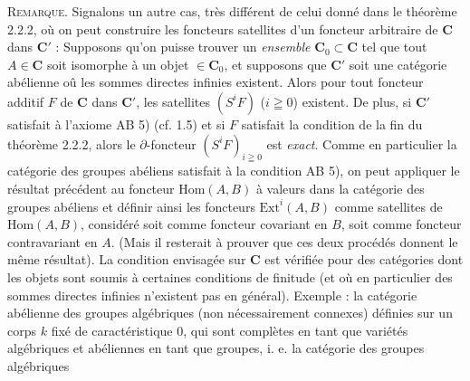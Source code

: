 \indent\textsc{Remarque.} Signalons un autre cas, très différent de celui
donné dans le théorème 2.2.2, où on peut construire les foncteurs satellites
d'un foncteur arbitraire de $\mathbf{C}$ dans $\mathbf{C}'$ : Supposons qu'on puisse trouver un
\textit{ensemble} $\mathbf{C}_0\subset \mathbf{C}$ tel que tout $A\in \mathbf{C}$ soit isomorphe à un objet
$\in \mathbf{C}_0$, et supposons que $\mathbf{C}'$ soit une catégorie abélienne oû les sommes
directes infinies existent. Alors pour tout foncteur additif $F$ de $\mathbf{C}$ dans
$\mathbf{C}'$, les satellites $(S^iF)$ ($i\geqq0$) existent. De plus, si $\mathbf{C}'$ satisfait
à l'axiome AB 5) (cf. 1.5) et si $F$ satisfait la condition de la fin du
théorème 2.2.2, alors le $\partial$-foncteur $(S^iF)_{i\geqq0}$ est \textit{exact}. Comme
en particulier la catégorie des groupes abéliens satisfait à la condition
AB 5), on peut appliquer le résultat précédent au foncteur
$\mathrm{Hom}(A,B)$ à valeurs dans la catégorie des groupes abéliens et
définir ainsi les foncteurs $\mathrm{Ext}^i(A,B)$ comme satellites de
$\mathrm{Hom}(A,B)$, considéré soit comme foncteur covariant en $B$, soit
comme foncteur contravariant en $A$. (Mais il resterait à prouver que ces deux
procédés donnent le même résultat). La condition envisagée sur $\mathbf{C}$ est
vérifiée pour des catégories dont les objets sont soumis à certaines
conditions de finitude (et où en particulier des sommes directes infinies
n'existent pas en général). Exemple : la catégorie abélienne des groupes
algébriques (non nécessairement connexes) définies sur un corps $k$ fixé de
caractéristique 0, qui sont complètes en tant que variétés algébriques et
abéliennes en tant que groupes, i. e. la catégorie des groupes algébriques

